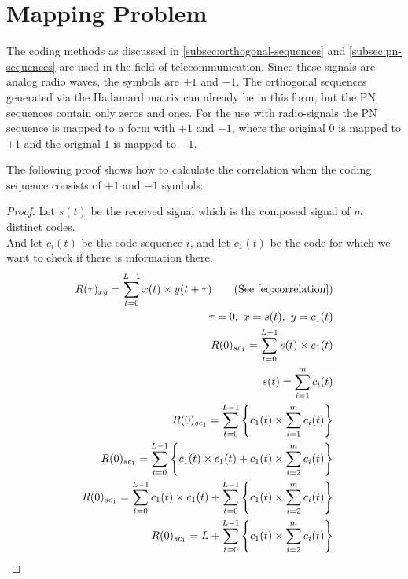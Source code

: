 
\section{Mapping Problem}
\label{sec:mapping-problem}

The coding methods as discussed in \autoref{subsec:orthogonal-sequences} and \autoref{subsec:pn-sequences} are used in the field of telecommunication.
Since these signals are analog radio waves, the symbols are $+1$ and $-1$.
The orthogonal sequences generated via the Hadamard matrix can already be in this form, but the PN sequences contain only zeros and ones.
For the use with radio-signals the PN sequence is mapped to a form with $+1$ and $-1$, where the original $0$ is mapped to $+1$ and the original $1$ is mapped to $-1$.




The following proof  shows how to calculate the correlation when the coding sequence consists of $+1$ and $-1$ symbols: 

\begin{proof}
	Let $s(t)$ be the received signal which is the composed signal of $m$ distinct codes.\\
	And let $c_i(t)$ be the code sequence $i$, and let $c_1(t)$ be the code for which we want to check if there is information there. \\

	\begin{align*}
		R(\tau)_{xy} = \displaystyle\sum_{t = 0} ^ {L - 1} x(t) \times y(t + \tau)	\tag{See \autoref{eq:correlation}}
		\\ \tau = 0,\ x = s(t),\ y = c_1(t)	
		\\ R(0)_{sc_{1}} = \displaystyle\sum_{t = 0} ^ {L - 1} s(t) \times c_1(t)
		\\ s(t) = \displaystyle\sum_{i = 1} ^ {m} c_i(t)														
		\\ R(0)_{sc_{1}} = \displaystyle\sum_{t = 0} ^ {L - 1}  \Bigg\{  c_1(t)	\times \displaystyle\sum_{i = 1} ^ {m} c_i(t) \Bigg\}
		\\ R(0)_{sc_{1}} = \displaystyle\sum_{t = 0} ^ {L - 1} \Bigg\{ c_1(t) \times c_1(t) + c_1(t) \times  \displaystyle\sum_{i = 2} ^ {m} c_i(t) \Bigg\} 
		\\ R(0)_{sc_{1}} = \displaystyle\sum_{t = 0} ^ {L - 1} c_1(t) \times c_1(t) + \displaystyle\sum_{t = 0} ^ {L - 1} \Bigg\{ c_1(t) \times  \displaystyle\sum_{i = 2} ^ {m} c_i(t) \Bigg\} 
		\\ R(0)_{sc_{1}} = L + \displaystyle\sum_{t = 0} ^ {L - 1} \Bigg\{ c_1(t) \times  \displaystyle\sum_{i = 2} ^ {m} c_i(t) \Bigg\} 
	\end{align*}

\end{proof}

